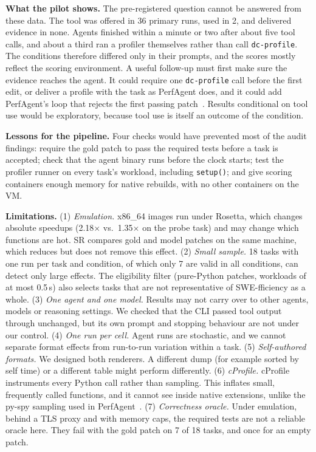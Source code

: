 \documentclass[conference]{IEEEtran}
\newcommand{\tool}{\texttt{dc-profile}}
\begin{document}
\textbf{What the pilot shows.} The pre-registered question cannot be answered
from these data. The tool was offered in 36 primary runs, used in 2, and
delivered evidence in none. Agents finished within a minute or two after about
five tool calls, and about a third ran a profiler themselves rather than
call \tool{}. The conditions therefore differed only in their prompts, and
the scores mostly reflect the scoring environment. A useful follow-up must
first make sure the evidence reaches the agent. It could require one \tool{}
call before the first edit, or deliver a profile with the task as PerfAgent
does, and it could add PerfAgent's loop that rejects the first passing
patch~\cite{deng2026perfagent}. Results conditional on tool use would be
exploratory, because tool use is itself an outcome of the condition.

\textbf{Lessons for the pipeline.} Four checks would have prevented most of
the audit findings: require the gold patch to pass the required tests before
a task is accepted; check that the agent binary runs before the clock starts;
test the profiler runner on every task's workload, including
\texttt{setup()}; and give scoring containers enough memory for native
rebuilds, with no other containers on the VM.

\textbf{Limitations.}
(1) \emph{Emulation.} x86\_64 images run under Rosetta, which changes absolute
speedups (2.18$\times$ vs.\ 1.35$\times$ on the probe task) and may change
which functions are hot. SR compares gold and model patches on the same
machine, which reduces but does not remove this effect.
(2) \emph{Small sample.} 18 tasks with one run per task and condition, of
which only 7 are valid in all conditions, can detect only large effects. The
eligibility filter (pure-Python patches, workloads of at most 0.5\,s) also
selects tasks that are not representative of SWE-fficiency as a whole.
(3) \emph{One agent and one model.} Results may not carry over to other
agents, models or reasoning settings. We checked that the CLI passed tool
output through unchanged, but its own prompt and stopping behaviour are not
under our control.
(4) \emph{One run per cell.} Agent runs are stochastic, and we cannot
separate format effects from run-to-run variation within a task.
(5) \emph{Self-authored formats.} We designed both renderers. A different
dump (for example sorted by self time) or a different table might perform
differently.
(6) \emph{cProfile.} cProfile instruments every Python call rather than
sampling. This inflates small, frequently called functions, and it cannot see
inside native extensions, unlike the py-spy sampling used in
PerfAgent~\cite{deng2026perfagent,mytkowicz2010evaluating}.
(7) \emph{Correctness oracle.} Under emulation, behind a TLS proxy and with
memory caps, the required tests are not a reliable oracle here. They fail with
the gold patch on 7 of 18 tasks, and once for an empty patch.
\end{document}
